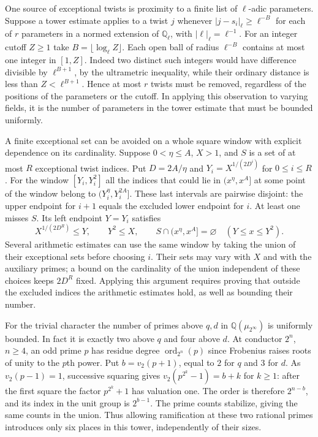 \documentclass[11pt]{amsart}
\theoremstyle{definition}
\theoremstyle{remark}
\begin{document}
One source of exceptional twists is proximity to a finite list
of $\ell$-adic parameters. Suppose a tower estimate applies to a
twist $j$ whenever $|j-s_i|_\ell\ge\ell^{-B}$ for each of $r$
parameters in a normed extension of $\mathbb Q_\ell$, with
$|\ell|_\ell=\ell^{-1}$. For an integer cutoff $Z\ge1$ take
$B=\lfloor\log_\ell Z\rfloor$. Each open ball of radius $\ell^{-B}$
contains at most one integer in $[1,Z]$. Indeed two distinct such
integers would have difference divisible by $\ell^{B+1}$, by the
ultrametric inequality, while their ordinary distance is less than
$Z<\ell^{B+1}$. Hence at most $r$ twists must be removed, regardless
of the positions of the parameters or the cutoff. In applying this
observation to varying fields, it is the number of parameters in the
tower estimate that must be bounded uniformly.

A finite exceptional set can be avoided on a whole square window
with explicit dependence on its cardinality. Suppose $0<\eta\le A$,
$X>1$, and $S$ is a set of at most $R$ exceptional twist indices.
Put $D=2A/\eta$ and $Y_i=X^{1/(2D^i)}$ for $0\le i\le R$.
For the window $[Y_i,Y_i^2]$ all the indices that could lie in
$(x^\eta,x^A]$ at some point of the window belong to
$(Y_i^\eta,Y_i^{2A}]$. These last intervals are pairwise disjoint:
the upper endpoint for $i+1$ equals the excluded lower endpoint for
$i$. At least one misses $S$. Its left endpoint $Y=Y_i$ satisfies
\[
 X^{1/(2D^R)}\le Y,\qquad Y^2\le X,\qquad
 S\cap(x^\eta,x^A]=\varnothing\quad(Y\le x\le Y^2).
\]
Several arithmetic estimates can use the same window by taking the
union of their exceptional sets before choosing $i$. Their sets may
vary with $X$ and with the auxiliary primes; a bound on the cardinality
of the union independent of these choices keeps $2D^R$ fixed.
Applying this argument requires proving that outside the excluded
indices the arithmetic estimates hold, as well as bounding their number.

For the trivial character the number of primes above $q,d$ in
$\mathbb Q(\mu_{2^\infty})$ is uniformly bounded. In fact it is
exactly two above $q$ and four above $d$. At conductor $2^n$,
$n\ge4$, an odd prime $p$ has residue degree
$\operatorname{ord}_{2^n}(p)$ since Frobenius raises roots of
unity to the $p$th power. Put $b=v_2(p+1)$, equal to $2$ for
$q$ and $3$ for $d$. As $v_2(p-1)=1$, successive squaring gives
$v_2(p^{2^k}-1)=b+k$ for $k\ge1$: after the first square the
factor $p^{2^k}+1$ has valuation one. The order is therefore
$2^{n-b}$, and its index in the unit group is $2^{b-1}$.
The prime counts stabilize, giving the same counts in the union.
Thus allowing ramification at these two rational primes introduces
only six places in this tower, independently of their sizes.
\end{document}
